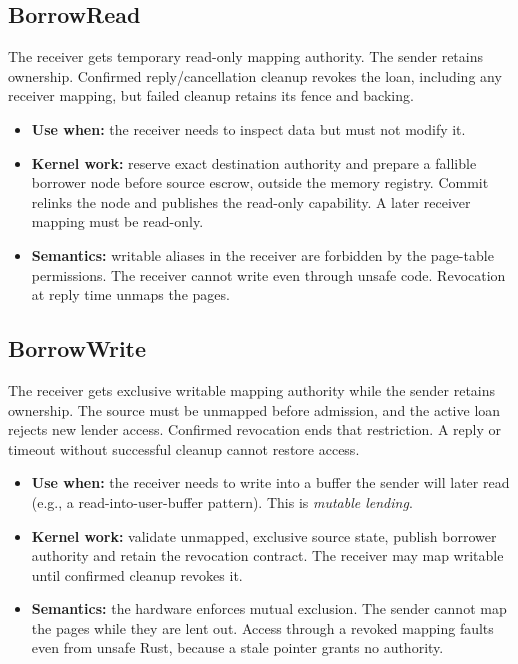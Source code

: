 \subsection{BorrowRead}

The receiver gets temporary read-only mapping authority. The sender retains
ownership. Confirmed reply/cancellation cleanup revokes the loan, including
any receiver mapping, but failed cleanup retains its fence and backing.

\begin{itemize}
    \item \textbf{Use when:} the receiver needs to inspect data but must not
        modify it.
    \item \textbf{Kernel work:} reserve exact destination authority and prepare
        a fallible borrower node before source escrow, outside the memory
        registry. Commit relinks the node and publishes the read-only capability.
        A later receiver mapping must be read-only.
    \item \textbf{Semantics:} writable aliases in the receiver are forbidden by
        the page-table permissions. The receiver cannot write even through unsafe
        code. Revocation at reply time unmaps the pages.
\end{itemize}

\subsection{BorrowWrite}

The receiver gets exclusive writable mapping authority while the sender retains
ownership. The source must be unmapped before admission, and the active loan rejects
new lender access. Confirmed revocation ends that restriction. A reply or timeout
without successful cleanup cannot restore access.

\begin{itemize}
    \item \textbf{Use when:} the receiver needs to write into a buffer the sender
        will later read (e.g., a read-into-user-buffer pattern). This is
        \emph{mutable lending}.
    \item \textbf{Kernel work:} validate unmapped, exclusive source state,
        publish borrower authority and retain the revocation contract. The
        receiver may map writable until confirmed cleanup revokes it.
    \item \textbf{Semantics:} the hardware enforces mutual exclusion. The sender
        cannot map the pages while they are lent out. Access through a revoked
        mapping faults even from unsafe Rust, because a stale pointer grants no authority.
\end{itemize}

